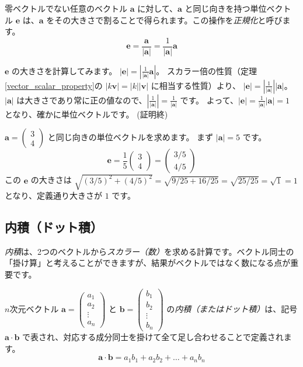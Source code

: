 \begin{thm}[単位ベクトルの正規化] \label{vector_normalization}
零ベクトルでない任意のベクトル $\bm{a}$ に対して、$\bm{a}$ と同じ向きを持つ単位ベクトル $\bm{e}$ は、$\bm{a}$ をその大きさで割ることで得られます。この操作を\emph{正規化}と呼びます。
\[\bm{e} = \frac{\bm{a}}{|\bm{a}|} = \frac{1}{|\bm{a}|} \bm{a}\]
\begin{proof*}
$\bm{e}$ の大きさを計算してみます。
$|\bm{e}| = \left| \frac{1}{|\bm{a}|} \bm{a} \right|$。
スカラー倍の性質（定理\ref{vector_scalar_property}の $|k\bm{v}| = |k||\bm{v}|$ に相当する性質）より、
$|\bm{e}| = \left| \frac{1}{|\bm{a}|} \right| |\bm{a}|$。
$|\bm{a}|$ は大きさであり常に正の値なので、$|\frac{1}{|\bm{a}|}| = \frac{1}{|\bm{a}|}$ です。
よって、$|\bm{e}| = \frac{1}{|\bm{a}|} |\bm{a}| = 1$ となり、確かに単位ベクトルです。
(証明終)
\end{proof*}
\end{thm}

\begin{ex}
$\bm{a} = \begin{pmatrix} 3 \\ 4 \end{pmatrix}$ と同じ向きの単位ベクトルを求めます。
まず $|\bm{a}| = 5$ です。
\[\bm{e} = \frac{1}{5} \begin{pmatrix} 3 \\ 4 \end{pmatrix} = \begin{pmatrix} 3/5 \\ 4/5 \end{pmatrix}\]
この $\bm{e}$ の大きさは $\sqrt{(3/5)^2 + (4/5)^2} = \sqrt{9/25 + 16/25} = \sqrt{25/25} = \sqrt{1} = 1$ となり、定義通り大きさが $1$ です。
\end{ex}

\subsection{内積（ドット積）}
\emph{内積}は、2つのベクトルから\emph{スカラー（数）}を求める計算です。ベクトル同士の「掛け算」と考えることができますが、結果がベクトルではなく数になる点が重要です。
\begin{dfn}[内積 - 成分による計算] \label{inner_product}
$n$次元ベクトル $\bm{a} = \begin{pmatrix} a_1 \\ a_2 \\ \vdots \\ a_n \end{pmatrix}$ と $\bm{b} = \begin{pmatrix} b_1 \\ b_2 \\ \vdots \\ b_n \end{pmatrix}$ の\emph{内積（またはドット積）}は、記号 $\bm{a} \cdot \bm{b}$ で表され、対応する成分同士を掛けて全て足し合わせることで定義されます。
\[\bm{a} \cdot \bm{b} = a_1 b_1 + a_2 b_2 + \dots + a_n b_n\]
\end{dfn}

